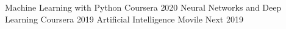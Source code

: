 
\begin{cvhonors}

  \cvhonor
    {Machine Learning with Python}
    {Coursera}
    {}
    {2020}
  \cvhonor
    {Neural Networks and Deep Learning}
    {Coursera}
    {}
    {2019}
  \cvhonor
    {Artificial Intelligence}
    {Movile Next}
    {}
    {2019}

\end{cvhonors}
